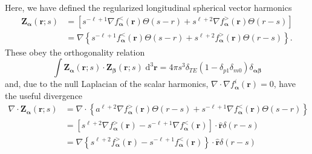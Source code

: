 Here, we have defined the regularized longitudinal spherical vector harmonics 
\begin{equation}\label{eq:regularizedLongitudinalHarmonics}
\begin{split}
\mathbf{Z}_{\bm{\alpha}}(\mathbf{r};s) &= \left[s^{-\ell + 1}\nabla f_{\bm{\alpha}}^<(\mathbf{r})\Theta(s - r) + s^{\ell + 2}\nabla f_{\bm{\alpha}}^>(\mathbf{r})\Theta(r - s)\right]\\
&= \nabla\left\{s^{-\ell + 1} f_{\bm{\alpha}}^<(\mathbf{r})\Theta(s - r) + s^{\ell + 2} f_{\bm{\alpha}}^>(\mathbf{r})\Theta(r - s)\right\}.
\end{split}
\end{equation}
These obey the orthogonality relation
\begin{equation}
\int\mathbf{Z}_{\bm{\alpha}}(\mathbf{r};s)\cdot\mathbf{Z}_{\bm{\beta}}(\mathbf{r};s)\;\mathrm{d}^3\mathbf{r} = 4\pi s^3\delta_{TE}(1 - \delta_{p1}\delta_{m0})\delta_{\bm{\alpha}\bm{\beta}}
\end{equation}
and, due to the null Laplacian of the scalar harmonics, $\nabla\cdot\nabla f_{\bm{\alpha}}^i(\mathbf{r}) = 0$, have the useful divergence
\begin{equation}
\begin{split}
\nabla\cdot\mathbf{Z}_{\bm{\alpha}}(\mathbf{r};s) &= \nabla\cdot\left\{a^{\ell + 2}\nabla f_{\bm{\alpha}}^>(\mathbf{r})\Theta(r - s) + s^{-\ell + 1}\nabla f_{\bm{\alpha}}^<(\mathbf{r})\Theta(s - r)\right\}\\[0.5em]
&= \left[s^{\ell + 2}\nabla f_{\bm{\alpha}}^>(\mathbf{r}) - s^{-\ell + 1}\nabla f_{\bm{\alpha}}^<(\mathbf{r})\right]\cdot\hat{\mathbf{r}}\delta(r - s)\\
&= \nabla\left\{s^{\ell + 2} f_{\bm{\alpha}}^>(\mathbf{r}) - s^{-\ell + 1} f_{\bm{\alpha}}^<(\mathbf{r})\right\}\cdot\hat{\mathbf{r}}\delta(r - s)
\end{split}
\end{equation}

